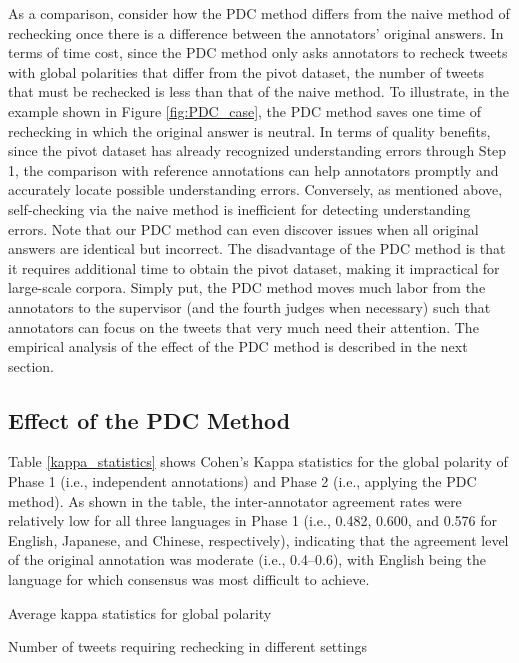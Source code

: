 \documentclass[english]{jnlp_1.4}
\begin{document}
As a comparison, consider how the PDC method differs from the naive method of rechecking once there is a difference between the annotators' original answers. In terms of time cost, since the PDC method only asks annotators to recheck tweets with global polarities that differ from the pivot dataset, the number of tweets that must be rechecked is less than that of the naive method. To illustrate, in the example shown in Figure \ref{fig:PDC_case}, the PDC method saves one time of rechecking in which the original answer is neutral. In terms of quality benefits, since the pivot dataset has already recognized understanding errors through Step 1, the comparison with reference annotations can help annotators promptly and accurately locate possible understanding errors. Conversely, as mentioned above, self-checking via the naive method is inefficient for detecting understanding errors. Note that our PDC method can even discover issues when all original answers are identical but incorrect. The disadvantage of the PDC method is that it requires additional time to obtain the pivot dataset, making it impractical for large-scale corpora. Simply put, the PDC method moves much labor from the annotators to the supervisor (and the fourth judges when necessary) such that annotators can focus on the tweets that very much need their attention. The empirical analysis of the effect of the PDC method is described in the next section.


\subsection{Effect of the PDC Method}

Table \ref{kappa_statistics} shows Cohen's Kappa statistics for the global polarity of Phase 1 (i.e., independent annotations) and Phase 2 (i.e., applying the PDC method). As shown in the table, the inter-annotator agreement rates were relatively low for all three languages in Phase 1 (i.e., 0.482, 0.600, and 0.576 for English, Japanese, and Chinese, respectively), indicating that the agreement level of the original annotation was moderate (i.e., 0.4--0.6), with English being the language for which consensus was most difficult to achieve.

\begin{table}[b]
\caption{Average kappa statistics for global polarity}
\label{kappa_statistics}

\end{table}
\begin{table}[b]
\caption{Number of tweets requiring rechecking in different settings}
\label{number_requiring_recheck}

\end{table}
\end{document}
